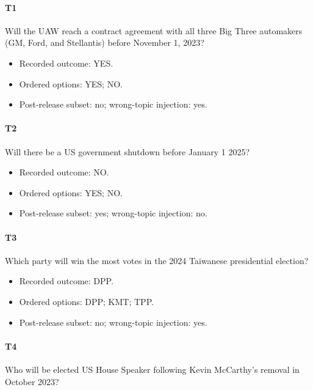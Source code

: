 \paragraph*{T1} Will the UAW reach a contract agreement with all three Big Three automakers (GM, Ford, and Stellantis) before November 1, 2023?

\begin{itemize}

\item Recorded outcome: YES.

\item Ordered options: YES; NO.

\item Post-release subset: no; wrong-topic injection: yes.

\end{itemize}

\paragraph*{T2} Will there be a US government shutdown before January 1 2025?

\begin{itemize}

\item Recorded outcome: NO.

\item Ordered options: YES; NO.

\item Post-release subset: yes; wrong-topic injection: no.

\end{itemize}

\paragraph*{T3} Which party will win the most votes in the 2024 Taiwanese presidential election?

\begin{itemize}

\item Recorded outcome: DPP.

\item Ordered options: DPP; KMT; TPP.

\item Post-release subset: no; wrong-topic injection: yes.

\end{itemize}

\paragraph*{T4} Who will be elected US House Speaker following Kevin McCarthy's removal in October 2023?

